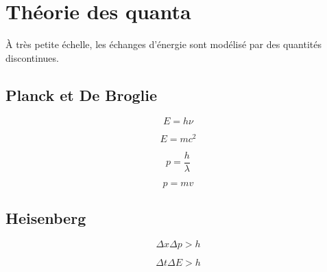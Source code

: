 

\section{Théorie des quanta}


À très petite échelle, les échanges d'énergie sont modélisé par des quantités discontinues.

\subsection{Planck et De Broglie}

\begin{minipage}[c]{.45\linewidth}

\[
E = h \nu
\]

\[
E = m c^2
\]

\end{minipage}
\hfill
\begin{minipage}[c]{.45\linewidth}

\[
p = \frac{ h}{ \lambda }
\]

\[
p = m v
\]

\end{minipage}

\subsection{Heisenberg}

\vspace{0.9cm}
\begin{minipage}[c]{.45\linewidth}

\[
\Delta x \Delta p > h
\]

\end{minipage}
\hfill
\begin{minipage}[c]{.45\linewidth}

\[
\Delta t \Delta E > h
\]

\end{minipage}


